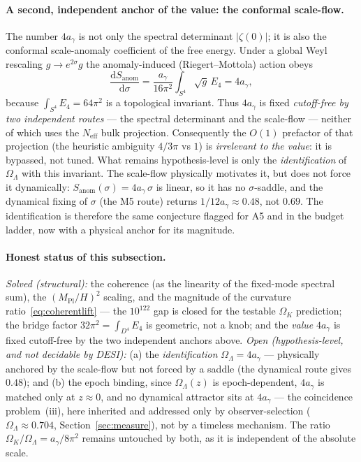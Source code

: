 \documentclass[11pt,a4paper]{article}
\theoremstyle{plain}
\theoremstyle{definition}
\theoremstyle{remark}
\newcommand{\Ok}{\Omega_K}
\newcommand{\OL}{\Omega_\Lambda}
\newcommand{\ag}{a_\gamma}
\newcommand{\Mpl}{M_{\mathrm{Pl}}}
\begin{document}
\paragraph{A second, independent anchor of the value: the conformal scale-flow.} The number
$4\ag$ is not only the spectral determinant $|\zeta(0)|$; it is also the conformal scale-anomaly
coefficient of the free energy. Under a global Weyl rescaling $g\to e^{2\sigma}g$ the
anomaly-induced (Riegert--Mottola) action obeys
\begin{equation}
\frac{\mathrm{d}S_{\mathrm{anom}}}{\mathrm{d}\sigma}
= \frac{\ag}{16\pi^2}\int_{S^4}\sqrt{g}\,E_4 = 4\ag ,
\end{equation}
because $\int_{S^4}E_4 = 64\pi^2$ is a topological invariant. Thus $4\ag$ is fixed
\emph{cutoff-free by two independent routes} --- the spectral determinant and the scale-flow ---
neither of which uses the $N_{\mathrm{eff}}$ bulk projection. Consequently the $O(1)$ prefactor
of that projection (the heuristic ambiguity $4/3\pi$ vs $1$) is \emph{irrelevant to the value}:
it is bypassed, not tuned. What remains hypothesis-level is only the \emph{identification} of
$\OL$ with this invariant. The scale-flow physically motivates it, but does not force it
dynamically: $S_{\mathrm{anom}}(\sigma)=4\ag\,\sigma$ is linear, so it has no $\sigma$-saddle, and
the dynamical fixing of $\sigma$ (the M5 route) returns $1/12\ag\approx0.48$, not $0.69$. The
identification is therefore the same conjecture flagged for A5 and in the budget ladder, now with
a physical anchor for its magnitude.

\paragraph{Honest status of this subsection.} \emph{Solved (structural):} the coherence (as the
linearity of the fixed-mode spectral sum), the $(\Mpl/H)^2$ scaling, and the magnitude of the
curvature ratio~\eqref{eq:coherentlift} --- the $10^{122}$ gap is closed for the testable $\Ok$
prediction; the bridge factor $32\pi^2=\int_{D^4}E_4$ is geometric, not a knob; and the
\emph{value} $4\ag$ is fixed cutoff-free by the two independent anchors above. \emph{Open (hypothesis-level, and not
decidable by DESI):} (a) the \emph{identification} $\OL=4\ag$ --- physically anchored by the
scale-flow but not forced by a saddle (the dynamical route gives $0.48$); and (b) the epoch
binding, since $\OL(z)$ is epoch-dependent, $4\ag$ is matched only at $z\approx0$, and no
dynamical attractor sits at $4\ag$ --- the coincidence problem~(iii), here inherited and
addressed only by observer-selection ($\OL\approx0.704$, Section~\ref{sec:measure}), not by a
timeless mechanism. The ratio $\Ok/\OL = \ag/8\pi^2$ remains untouched by both, as it is
independent of the absolute scale.
\end{document}
